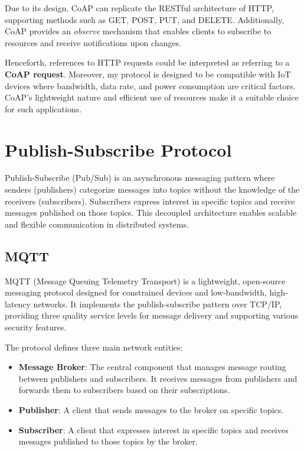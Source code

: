 Due to its design, CoAP can replicate the RESTful architecture of HTTP, supporting methods such as GET, POST, PUT, and DELETE. Additionally, CoAP provides an \textit{observe} mechanism that enables clients to subscribe to resources and receive notifications upon changes.

Henceforth, references to HTTP requests could be interpreted as referring to a \textbf{CoAP request}. Moreover, my protocol is designed to be compatible with IoT devices where bandwidth, data rate, and power consumption are critical factors. CoAP's lightweight nature and efficient use of resources make it a suitable choice for such applications.

\section{Publish-Subscribe Protocol}
Publish-Subscribe (Pub/Sub) is an asynchronous messaging pattern where senders (publishers) categorize messages into topics without the knowledge of the receivers (subscribers). Subscribers express interest in specific topics and receive messages published on those topics. This decoupled architecture enables scalable and flexible communication in distributed systems.

\subsection{MQTT} \label{sec:mqtt}
MQTT (Message Queuing Telemetry Transport) is a lightweight, open-source messaging protocol designed for constrained devices and low-bandwidth, high-latency networks. It implements the publish-subscribe pattern over TCP/IP, providing three quality service levels for message delivery and supporting various security features.

The protocol defines three main network entities:
\begin{itemize}
    \item \textbf{Message Broker}: The central component that manages message routing between publishers and subscribers. It receives messages from publishers and forwards them to subscribers based on their subscriptions.
    \item \textbf{Publisher}: A client that sends messages to the broker on specific topics. 
    \item \textbf{Subscriber}: A client that expresses interest in specific topics and receives messages published to those topics by the broker.
\end{itemize}

